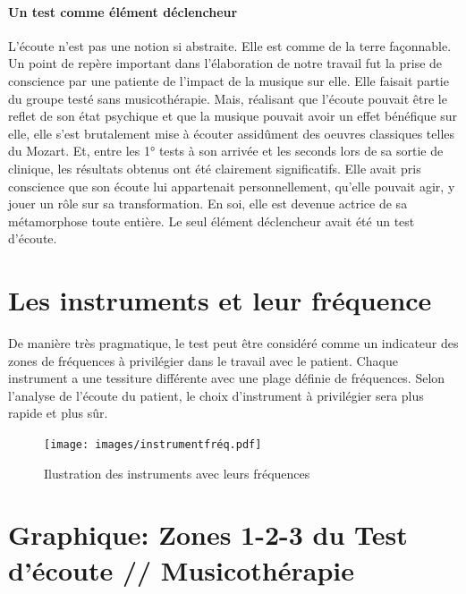         
\paragraph{Un test comme élément déclencheur}

L'écoute n'est pas une notion si abstraite. Elle est comme de la terre façonnable.
 Un point de
 repère important dans l'élaboration de notre travail fut la prise de
 conscience par une patiente de l'impact de la musique sur elle.
 Elle faisait partie du groupe testé sans
  musicothérapie. Mais, réalisant que l'écoute pouvait être le reflet
  de son état psychique et  que la
  musique pouvait avoir un effet bénéfique sur elle, elle s'est
  brutalement mise à écouter
  assidûment des oeuvres classiques telles du 
  Mozart. Et, entre les 1° tests à son arrivée et les
  seconds lors de sa sortie de clinique, les résultats
  obtenus ont été clairement significatifs.
  Elle avait pris conscience que son écoute lui appartenait
  personnellement, qu'elle pouvait agir, y jouer un rôle sur sa
  transformation. En soi, elle est devenue actrice de sa
  métamorphose toute entière. Le seul élément déclencheur avait été un
  test d'écoute.


  \section{Les instruments et leur fréquence }
 De manière très pragmatique, le test peut être
considéré comme un indicateur des zones de fréquences à
privilégier dans le travail avec le patient. Chaque instrument a une tessiture
différente avec une plage
définie de fréquences. Selon l'analyse de l'écoute du patient, le choix
d'instrument à privilégier sera plus rapide et plus sûr.

      \begin{figure}
	\centering
	\texttt{[image: images/instrumentfréq.pdf]}
	\caption[Les instruments et leurs fréquences]{Ilustration des instruments avec leurs fréquences}
       
	\label{instrumentfreq}
\end{figure}
  



\section{Graphique: Zones 1-2-3 du Test d'écoute // Musicothérapie}


